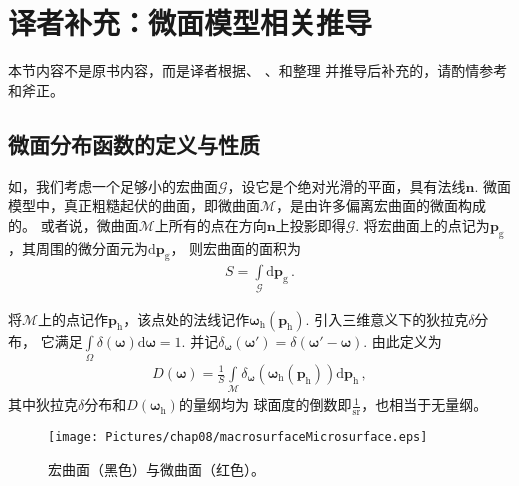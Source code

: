 \section{译者补充：微面模型相关推导}\label{sec:译者补充：微面模型相关推导}
\begin{remark}
    本节内容不是原书内容，而是译者根据\citet{heitz:hal-01024289}、
    \citet{1138991}、\citet{1142437}和\citet{10.5555/2383847.2383874}整理
    并推导后补充的，请酌情参考和斧正。
\end{remark}
\subsection{微面分布函数的定义与性质}\label{sub:微面分布函数的定义与性质}
如，我们考虑一个足够小的宏曲面$\mathcal{G}$，设它是个绝对光滑的平面，具有法线$\bm n$.
微面模型中，真正粗糙起伏的曲面，即微曲面$\mathcal{M}$，是由许多偏离宏曲面的微面构成的。
或者说，微曲面$\mathcal{M}$上所有的点在方向$\bm n$上投影即得$\mathcal{G}$.
将宏曲面上的点记为${\bm p}_{\mathrm{g}}$，其周围的微分面元为$\mathrm{d}{\bm p}_{\mathrm{g}}$，
则宏曲面的面积为
\begin{align}
    S=\int\limits_{\mathcal{G}}\mathrm{d}{\bm p}_{\mathrm{g}}\, .
\end{align}

将$\mathcal{M}$上的点记作${\bm p}_{\mathrm{h}}$，该点处的法线记作${\bm\omega}_{\mathrm{h}}({\bm p}_{\mathrm{h}})$.
引入三维意义下的狄拉克$\delta$分布，
它满足$\displaystyle\int\limits_{\varOmega}\delta({\bm\omega})\mathrm{d}{\bm\omega}=1$.
并记$\delta_{\bm\omega}({\bm\omega}')=\delta({\bm\omega}'-{\bm\omega})$.
由此定义为
\begin{align}\label{eq:08ex01-MicrosurfaceDistribution}
    D({\bm\omega})=\displaystyle\frac{1}{S}\int\limits_{\mathcal{M}}
    \delta_{\bm\omega}({\bm\omega}_{\mathrm{h}}({\bm p}_{\mathrm{h}}))
    \mathrm{d}{\bm p}_{\mathrm{h}}\, ,
\end{align}
其中狄拉克$\delta$分布和$D({\bm\omega}_{\mathrm{h}})$的量纲均为
球面度的倒数即$\displaystyle\frac{1}{\text{sr}}$，也相当于无量纲。

\begin{figure}[htbp]
    \centering
    \texttt{[image: Pictures/chap08/macrosurfaceMicrosurface.eps]}
    \caption{宏曲面（黑色）与微曲面（红色）。}
    \label{fig:08ex01-macrosurfaceMicrosurface}
\end{figure}

